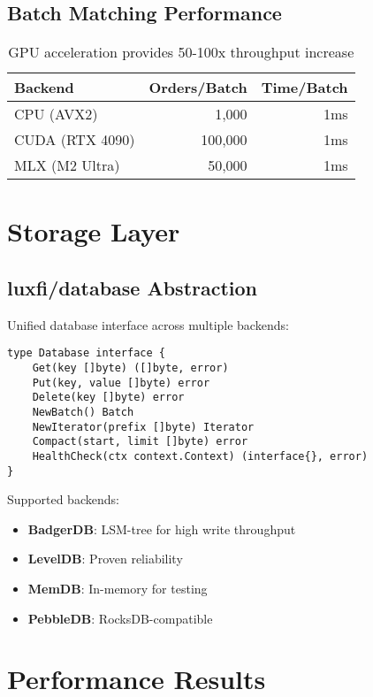 \documentclass[11pt,a4paper]{article}
\begin{document}
\subsection{Batch Matching Performance}

\begin{table}[H]
\centering
\begin{tabular}{lrr}
\toprule
\textbf{Backend} & \textbf{Orders/Batch} & \textbf{Time/Batch} \\
\midrule
CPU (AVX2) & 1,000 & 1ms \\
CUDA (RTX 4090) & 100,000 & 1ms \\
MLX (M2 Ultra) & 50,000 & 1ms \\
\bottomrule
\end{tabular}
\caption{GPU acceleration provides 50-100x throughput increase}
\end{table}

\section{Storage Layer}

\subsection{luxfi/database Abstraction}

Unified database interface across multiple backends:

\begin{lstlisting}
type Database interface {
    Get(key []byte) ([]byte, error)
    Put(key, value []byte) error
    Delete(key []byte) error
    NewBatch() Batch
    NewIterator(prefix []byte) Iterator
    Compact(start, limit []byte) error
    HealthCheck(ctx context.Context) (interface{}, error)
}
\end{lstlisting}

Supported backends:
\begin{itemize}
    \item \textbf{BadgerDB}: LSM-tree for high write throughput
    \item \textbf{LevelDB}: Proven reliability
    \item \textbf{MemDB}: In-memory for testing
    \item \textbf{PebbleDB}: RocksDB-compatible
\end{itemize}

\section{Performance Results}
\end{document}
